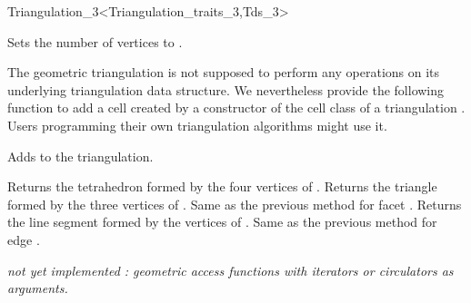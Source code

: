 \begin{ccRefClass}{Triangulation_3<Triangulation_traits_3,Tds_3>}
\begin{ccAdvanced}
{Sets the number of vertices to .}

\ccModifiers
The geometric triangulation is not supposed to perform any operations
on its underlying triangulation data structure. We nevertheless
provide the following function to add a cell created by a constructor
of the cell class of a triangulation
. 
Users programming their own
triangulation algorithms might use it.

{Adds  to the triangulation.
}
\end{ccAdvanced}


{Returns the tetrahedron formed by the four vertices of .
}
\ccGlue
{}
{Returns the triangle formed by the three vertices of . 
}
\ccGlue
{}
{Same as the previous method for facet .
}
\ccGlue
{}
{Returns the line segment formed by the vertices of .
}
\ccGlue
{}
{Same as the previous method for edge .
}

 \textit{not yet implemented : geometric access functions with iterators or
circulators as arguments.}



\end{ccRefClass}
